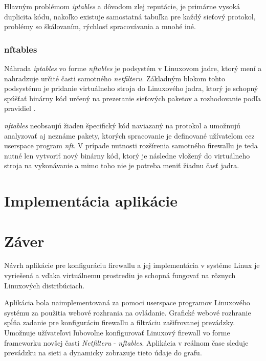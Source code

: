 Hlavným problémom \emph{iptables} a dôvodom zlej reputácie, je primárne vysoká duplicita kódu, nakoľko existuje samostatná tabuľka pre každý sieťový protokol, problémy so škálovaním, rýchlosť spracovávania a mnohé iné.

\subsection{nftables}
\label{nftables}
Náhrada \emph{iptables} vo forme \emph{nftables} je podsystém v Linuxovom jadre, ktorý mení a nahradzuje určité časti samotného \emph{netfilteru}. Základným blokom tohto podsystému je pridanie virtuálneho stroja do Linuxového jadra, ktorý je schopný spúšťať binárny kód určený na prezeranie sieťových paketov a rozhodovanie podľa pravidiel \cite{manpages, netfilter}. 

                                                                                 
\emph{nftables} neobsaujú žiaden špecifický kód naviazaný na protokol a umožnujú analyzovať aj neznáme pakety, ktorých spracovanie je definované užívateľom cez userspace program \emph{nft}. V prípade nutnosti rozšírenia samotného firewallu je teda nutné len vytvoriť nový binárny kód, ktorý je následne vložený do virtuálneho stroja na vykonávanie a mimo toho nie je potreba meniť žiadnu časť jadra.



\chapter{Implementácia aplikácie}


\chapter*{Záver}

Návrh aplikácie pre konfiguráciu firewallu a jej implementácia v systéme Linux je vyriešená a vďaka virtuálnemu prostrediu je schopná fungovať na rôznych Linuxových distribúciach. 

Aplikácia bola naimplementovaná za pomoci userspace programov Linuxového systému za použitia webové rozhrania na ovládanie.
Grafické webové rozhranie spĺňa zadanie pre konfiguráciu firewallu a filtráciu zašifrovanej prevádzky. Umožnuje užívateľovi ľubovoľne konfigurovať Linuxový firewall vo forme frameworku novšej časti \emph{Netfilteru} - \emph{nftables}. Aplikácia v reálnom čase sleduje prevádzku na sieti a dynamicky zobrazuje tieto údaje do grafu. 

